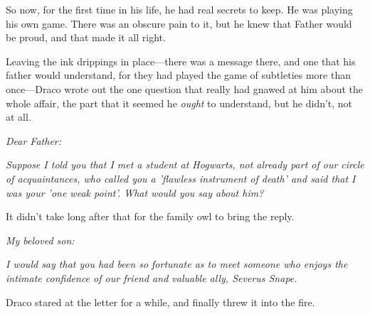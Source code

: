 So now, for the first time in his life, he had real secrets to keep. He was 
playing his own game. There was an obscure pain to it, but he knew that Father 
would be proud, and that made it all right.

Leaving the ink drippings in place---there was a message there, and one that 
his father would understand, for they had played the game of subtleties more 
than once---Draco wrote out the one question that really had gnawed at him 
about the whole affair, the part that it seemed he \emph{ought} to understand, 
but he didn't, not at all.

\emph{Dear Father:}

\emph{Suppose I told you that I met a student at Hogwarts, not already part of 
our circle of acquaintances, who called you a 'flawless instrument of death' 
and said that I was your 'one weak point'. What would you say about him?}

It didn't take long after that for the family owl to bring the reply.

\emph{My beloved son:}

\emph{I would say that you had been so fortunate as to meet someone who enjoys 
the intimate confidence of our friend and valuable ally, Severus Snape.}

Draco stared at the letter for a while, and finally threw it into the fire.
